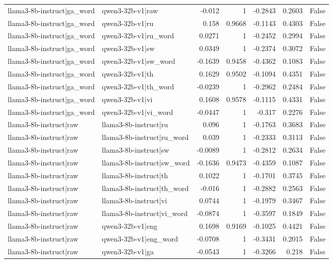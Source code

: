 \begin{table}
\begin{tabular}{l l r r r r l}
llama3-8b-instruct|ga_word & qwen3-32b-v1|raw & -0.012 & 1 & -0.2843 & 0.2603 & False \\
llama3-8b-instruct|ga_word & qwen3-32b-v1|ru & 0.158 & 0.9668 & -0.1143 & 0.4303 & False \\
llama3-8b-instruct|ga_word & qwen3-32b-v1|ru_word & 0.0271 & 1 & -0.2452 & 0.2994 & False \\
llama3-8b-instruct|ga_word & qwen3-32b-v1|sw & 0.0349 & 1 & -0.2374 & 0.3072 & False \\
llama3-8b-instruct|ga_word & qwen3-32b-v1|sw_word & -0.1639 & 0.9458 & -0.4362 & 0.1083 & False \\
llama3-8b-instruct|ga_word & qwen3-32b-v1|th & 0.1629 & 0.9502 & -0.1094 & 0.4351 & False \\
llama3-8b-instruct|ga_word & qwen3-32b-v1|th_word & -0.0239 & 1 & -0.2962 & 0.2484 & False \\
llama3-8b-instruct|ga_word & qwen3-32b-v1|vi & 0.1608 & 0.9578 & -0.1115 & 0.4331 & False \\
llama3-8b-instruct|ga_word & qwen3-32b-v1|vi_word & -0.0447 & 1 & -0.317 & 0.2276 & False \\
llama3-8b-instruct|raw & llama3-8b-instruct|ru & 0.096 & 1 & -0.1763 & 0.3683 & False \\
llama3-8b-instruct|raw & llama3-8b-instruct|ru_word & 0.039 & 1 & -0.2333 & 0.3113 & False \\
llama3-8b-instruct|raw & llama3-8b-instruct|sw & -0.0089 & 1 & -0.2812 & 0.2634 & False \\
llama3-8b-instruct|raw & llama3-8b-instruct|sw_word & -0.1636 & 0.9473 & -0.4359 & 0.1087 & False \\
llama3-8b-instruct|raw & llama3-8b-instruct|th & 0.1022 & 1 & -0.1701 & 0.3745 & False \\
llama3-8b-instruct|raw & llama3-8b-instruct|th_word & -0.016 & 1 & -0.2882 & 0.2563 & False \\
llama3-8b-instruct|raw & llama3-8b-instruct|vi & 0.0744 & 1 & -0.1979 & 0.3467 & False \\
llama3-8b-instruct|raw & llama3-8b-instruct|vi_word & -0.0874 & 1 & -0.3597 & 0.1849 & False \\
llama3-8b-instruct|raw & qwen3-32b-v1|eng & 0.1698 & 0.9169 & -0.1025 & 0.4421 & False \\
llama3-8b-instruct|raw & qwen3-32b-v1|eng_word & -0.0708 & 1 & -0.3431 & 0.2015 & False \\
llama3-8b-instruct|raw & qwen3-32b-v1|ga & -0.0543 & 1 & -0.3266 & 0.218 & False \\

\end{tabular}
\end{table}
